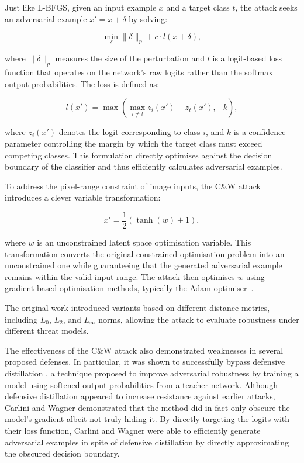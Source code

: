 \documentclass[review]{AIM_report}
\begin{document}
Just like L-BFGS, given an input example $x$ and a target class $t$, the attack seeks an adversarial example $x'=x+\delta$ by solving:

\begin{equation}
\min_{\delta} \|\delta\|_p + c \cdot l(x+\delta),
\end{equation}

where $\|\delta\|_p$ measures the size of the perturbation and $l$ is a logit-based loss function that operates on the network's raw logits rather than the softmax output probabilities. The loss is defined as:

\begin{equation}
l(x') =
\max \left(
\max_{i \neq t} z_i(x') - z_t(x'),
-k
\right),
\end{equation}

where $z_i(x')$ denotes the logit corresponding to class $i$, and $k$ is a confidence parameter controlling the margin by which the target class must exceed competing classes. This formulation directly optimises against the decision boundary of the classifier and thus efficiently calculates adversarial examples.

To address the pixel-range constraint of image inputs, the C\&W attack introduces a clever variable transformation:

\begin{equation}
x'=\frac{1}{2}(\tanh(w)+1),
\end{equation}

where $w$ is an unconstrained latent space optimisation variable. This transformation converts the original constrained optimisation problem into an unconstrained one while guaranteeing that the generated adversarial example remains within the valid input range. The attack then optimises $w$ using gradient-based optimisation methods, typically the Adam optimiser~\cite{kingma2014adam}.

The original work introduced variants based on different distance metrics, including $L_0$, $L_2$, and $L_\infty$ norms, allowing the attack to evaluate robustness under different threat models.

The effectiveness of the C\&W attack also demonstrated weaknesses in several proposed defenses. In particular, it was shown to successfully bypass defensive distillation \cite{papernot2016distillation}, a technique proposed to improve adversarial robustness by training a model using softened output probabilities from a teacher network. Although defensive distillation appeared to increase resistance against earlier attacks, Carlini and Wagner demonstrated that the method did in fact only obscure the model's gradient albeit not truly hiding it. By directly targeting the logits with their loss function, Carlini and Wagner were able to efficiently generate adversarial examples in spite of defensive distillation by directly approximating the obscured decision boundary.
\end{document}
